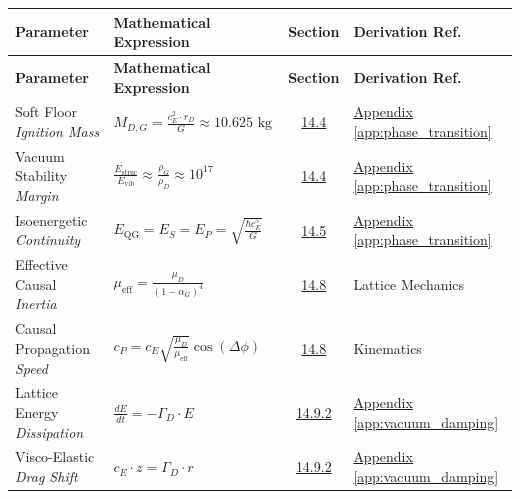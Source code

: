 \vspace{0.5cm}
\noindent
\renewcommand{\arraystretch}{1.6}
\begin{longtable}{@{} p{4.5cm} p{6cm} c p{4cm} @{}}
\toprule
\textbf{Parameter} & \textbf{Mathematical Expression} & \textbf{Section} & \textbf{Derivation Ref.} \\
\midrule
\endfirsthead

\toprule
\textbf{Parameter} & \textbf{Mathematical Expression} & \textbf{Section} & \textbf{Derivation Ref.} \\
\midrule
\endhead

Soft Floor \newline \textit{Ignition Mass} & $M_{D,G} = \frac{c_E^2 \cdot r_D}{G} \approx 10.625 \text{ kg}$ & \hyperref[sec:14.4]{14.4} & \hyperref[app:phase_transition]{Appendix \ref*{app:phase_transition}} \\

Vacuum Stability \newline \textit{Margin} & $\frac{E_{\text{struc}}}{E_{\text{vib}}} \approx \frac{\rho_G}{\rho_D} \approx 10^{17}$ & \hyperref[sec:14.4]{14.4} & \hyperref[app:phase_transition]{Appendix \ref*{app:phase_transition}} \\

Isoenergetic \newline \textit{Continuity} & $E_{\text{QG}} = E_S = E_P = \sqrt{\frac{\hbar c_E^5}{G}}$ & \hyperref[sec:14.5]{14.5} & \hyperref[app:phase_transition]{Appendix \ref*{app:phase_transition}} \\

Effective Causal \newline \textit{Inertia} & $\mu_{\text{eff}} = \frac{\mu_D}{(1 - \alpha_G)^4}$ & \hyperref[sec:14.8]{14.8} & Lattice Mechanics \\

Causal Propagation \newline \textit{Speed} & $c_P = c_E \sqrt{\frac{\mu_D}{\mu_{\text{eff}}}} \cos(\Delta\phi)$ & \hyperref[sec:14.8]{14.8} & Kinematics \\

Lattice Energy \newline \textit{Dissipation} & $\frac{dE}{dt} = -\Gamma_D \cdot E$ & \hyperref[sec:14.9.2]{14.9.2} & \hyperref[app:vacuum_damping]{Appendix \ref*{app:vacuum_damping}} \\

Visco-Elastic \newline \textit{Drag Shift} & $c_E \cdot z = \Gamma_D \cdot r$ & \hyperref[sec:14.9.2]{14.9.2} & \hyperref[app:vacuum_damping]{Appendix \ref*{app:vacuum_damping}} \\


\end{longtable}
